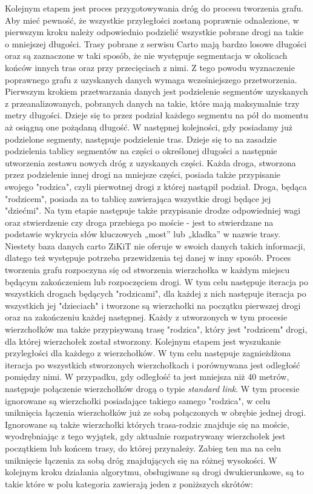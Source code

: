 Kolejnym etapem jest proces przygotowywania dróg do procesu tworzenia grafu. Aby mieć pewność, że wszystkie przyległości zostaną poprawnie odnalezione, w pierwszym kroku należy odpowiednio podzielić wszystkie pobrane drogi na takie o mniejszej długości. Trasy pobrane z serwisu Carto mają bardzo losowe długości oraz są zaznaczone w taki sposób, że nie występuje segmentacja w okolicach końców innych tras oraz przy przecięciach z nimi. Z tego powodu wyznaczenie poprawnego grafu z uzyskanych danych wymaga wcześniejszego przetworzenia. Pierwszym krokiem przetwarzania danych jest podzielenie segmentów uzyskanych z przeanalizowanych, pobranych danych na takie, które mają maksymalnie trzy metry długości. Dzieje się to przez podział każdego segmentu na pół do momentu aż osiągną one pożądaną długość. W następnej kolejności, gdy posiadamy już podzielone segmenty, następuje podzielenie tras. Dzieje się to na zasadzie podzielenia tablicy segmentów na części o określonej długości a następnie utworzenia zestawu nowych dróg z uzyskanych części. Każda droga, stworzona przez podzielenie innej drogi na mniejsze części, posiada także przypisanie swojego "rodzica", czyli pierwotnej drogi z której nastąpił podział. Droga, będąca "rodzicem", posiada za to tablicę zawierająca wszystkie drogi będące jej "dziećmi". Na tym etapie następuje także przypisanie drodze odpowiedniej wagi oraz stwierdzenie czy droga przebiega po moście - jest to stwierdzane na podstawie wykrycia słów kluczowych „most” lub „kladka” w nazwie trasy. Niestety baza danych carto ZiKiT nie oferuje w swoich danych takich informacji, dlatego też występuje potrzeba przewidzenia tej danej w inny sposób. \newline
Proces tworzenia grafu rozpoczyna się od stworzenia wierzchołka w każdym miejscu będącym zakończeniem lub rozpoczęciem drogi. W tym celu następuje iteracja po wszystkich drogach będących "rodzicami", dla każdej z nich następuje iteracja po wszystkich jej "dzieciach" i tworzone są wierzchołki na początku pierwszej drogi oraz na zakończeniu każdej następnej. Każdy z utworzonych w tym procesie wierzchołków ma także przypisywaną trasę "rodzica", który jest "rodzicem" drogi, dla której wierzchołek został stworzony. Kolejnym etapem jest wyszukanie przyległości dla każdego z wierzchołków. W tym celu następuje zagnieżdżona iteracja po wszystkich stworzonych wierzchołkach i porównywana jest odległość pomiędzy nimi. W przypadku, gdy odległość ta jest mniejsza niż 40 metrów, następuje połączenie wierzchołków drogą o typie \textit{standard link}. W tym procesie ignorowane są wierzchołki posiadające takiego samego "rodzica", w celu uniknięcia łączenia wierzchołków już ze sobą połączonych w obrębie jednej drogi. Ignorowane są także wierzchołki których trasa-rodzic znajduje się na moście, wyodrębniając z tego wyjątek, gdy aktualnie rozpatrywany wierzchołek jest początkiem lub końcem trasy, do której przynależy. Zabieg ten ma na celu uniknięcie łączenia za sobą dróg znajdujących się na różnej wysokości.
W kolejnym kroku działania algorytmu, obsługiwane są drogi dwukierunkowe, są to takie które w polu kategoria zawierają jeden z poniższych skrótów:


